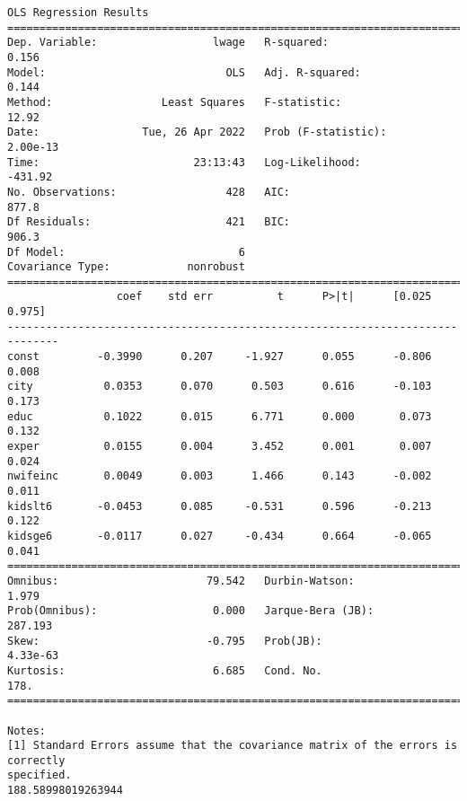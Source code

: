 \documentclass[11pt]{article}
\makeatletter
\newcommand{\boxspacing}{\kern\kvtcb@left@rule\kern\kvtcb@boxsep}
\newcommand{\prompt}[4]{
        {\ttfamily\llap{{\color{#2}[#3]:\hspace{3pt}#4}}\vspace{-\baselineskip}}
    }
\makeatother
\begin{document}
    \begin{Verbatim}[commandchars=\\\{\}]
                            OLS Regression Results
==============================================================================
Dep. Variable:                  lwage   R-squared:                       0.156
Model:                            OLS   Adj. R-squared:                  0.144
Method:                 Least Squares   F-statistic:                     12.92
Date:                Tue, 26 Apr 2022   Prob (F-statistic):           2.00e-13
Time:                        23:13:43   Log-Likelihood:                -431.92
No. Observations:                 428   AIC:                             877.8
Df Residuals:                     421   BIC:                             906.3
Df Model:                           6
Covariance Type:            nonrobust
==============================================================================
                 coef    std err          t      P>|t|      [0.025      0.975]
------------------------------------------------------------------------------
const         -0.3990      0.207     -1.927      0.055      -0.806       0.008
city           0.0353      0.070      0.503      0.616      -0.103       0.173
educ           0.1022      0.015      6.771      0.000       0.073       0.132
exper          0.0155      0.004      3.452      0.001       0.007       0.024
nwifeinc       0.0049      0.003      1.466      0.143      -0.002       0.011
kidslt6       -0.0453      0.085     -0.531      0.596      -0.213       0.122
kidsge6       -0.0117      0.027     -0.434      0.664      -0.065       0.041
==============================================================================
Omnibus:                       79.542   Durbin-Watson:                   1.979
Prob(Omnibus):                  0.000   Jarque-Bera (JB):              287.193
Skew:                          -0.795   Prob(JB):                     4.33e-63
Kurtosis:                       6.685   Cond. No.                         178.
==============================================================================

Notes:
[1] Standard Errors assume that the covariance matrix of the errors is correctly
specified.
188.58998019263944
    \end{Verbatim}

    \begin{tcolorbox}[breakable, size=fbox, boxrule=1pt, pad at break*=1mm,colback=cellbackground, colframe=cellborder]
\prompt{In}{incolor}{ }{\boxspacing}
\begin{Verbatim}[commandchars=\\\{\}]

\end{Verbatim}
\end{tcolorbox}
\end{document}
